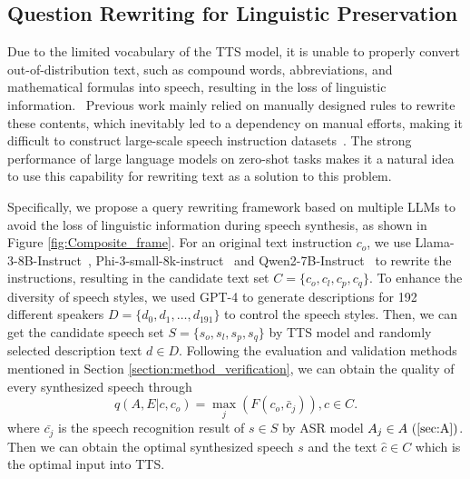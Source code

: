\documentclass[11pt]{article}
\begin{document}
	\subsection{Question Rewriting for Linguistic Preservation}\label{section:llm_rewriting}
	
	Due to the limited vocabulary of the TTS model, it is unable to properly convert out-of-distribution text, such as compound words, abbreviations, and mathematical formulas into speech, resulting in the loss of linguistic information.~%
	Previous work mainly relied on manually designed rules to rewrite these contents, which inevitably led to a dependency on manual efforts, making it difficult to construct large-scale speech instruction datasets~\citep{yang2024airbenchbenchmarkinglargeaudiolanguage}.
	The strong performance of large language models on zero-shot tasks makes it a natural idea to use this capability for rewriting text as a solution to this problem.
	
	Specifically, we propose a query rewriting framework based on multiple LLMs to avoid the loss of linguistic information during speech synthesis, as shown in Figure \ref{fig:Composite_frame}. 
	For an original text instruction $c_o$, we use  Llama-3-8B-Instruct~\citep{dubey2024llama3herdmodels},  Phi-3-small-8k-instruct~\citep{abdin2024phi3technicalreporthighly} and Qwen2-7B-Instruct~\citep{yang2024qwen2technicalreport}  to rewrite the instructions, resulting in the candidate text set $C=\{c_o,c_l,c_p,c_q\}$.
	To enhance the diversity of speech styles, we used GPT-4 to generate descriptions for 192 different speakers $D = \{d_0, d_1, \dots ,d_{191}\}  $ to control the speech styles.
	Then, we can get the candidate speech set $S=\{s_o,s_l,s_p,s_q\}$ by TTS model and randomly selected description text $d \in D$. 
	Following the evaluation and validation methods mentioned in Section \ref{section:method_verification}, we can obtain the quality of every synthesized speech through 
	\begin{equation}
		q(A,E|c,c_o)=\max_{j}(F(c_o,\bar{c}_j)), c \in C. \label{equation:quality}
	\end{equation}
	where  $\bar{c_j}$ is the speech recognition result of $s \in S$ by ASR model $A_j\in A~(\ref{sec:A})$. Then we can obtain the optimal synthesized speech $s$ and the text $\hat{c} \in C$ which is the optimal input into TTS.
	
\end{document}
